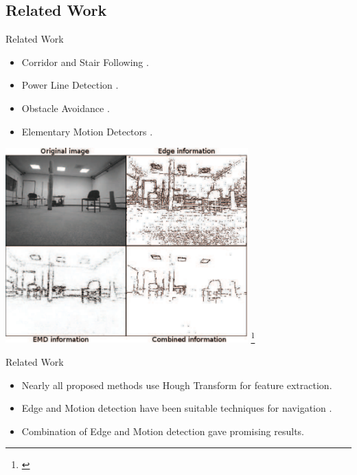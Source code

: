 \documentclass{beamer}
\begin{document}
\subsection{Related Work}
\begin{frame}
\begin{block}{Related Work}
\begin{itemize}
\item Corridor and Stair Following \cite{Bills2011}.
\item Power Line Detection \cite{Golightly2005, Zhengrong2008, Katrasnik2010}.
\item Obstacle Avoidance \cite{Jurriaans2011}.
\item Elementary Motion Detectors \cite{Gerke2011}.
\end{itemize}
\end{block}
\end{frame}

\begin{frame}
\begin{center}
\includegraphics[width=0.7\textwidth]{images/gerke2011.png}
\footnote{\cite{Gerke2011}}
\end{center}
\end{frame}

\begin{frame}
\begin{block}{Related Work}
\begin{itemize}
\item Nearly all proposed methods use Hough Transform for feature extraction.
\item Edge and Motion detection have been suitable techniques for navigation .
\item Combination of Edge and Motion detection gave promising results.
\end{itemize}
\end{block}
\end{frame}
\end{document}
